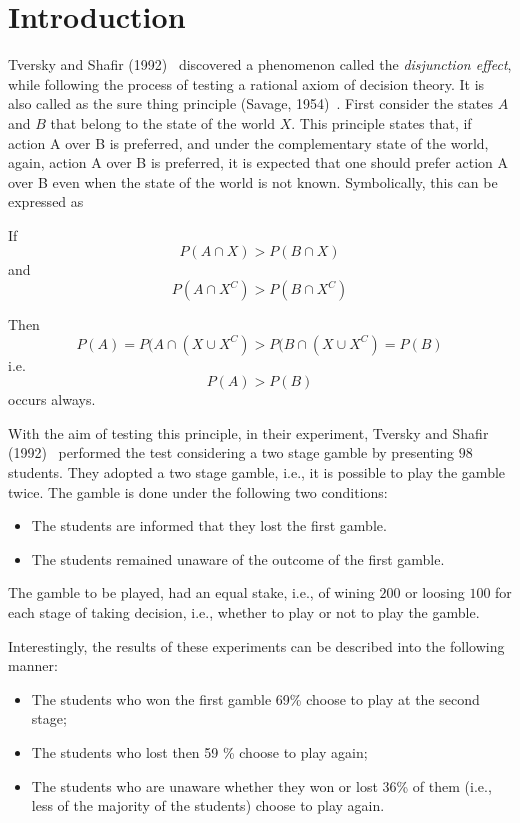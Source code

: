 \documentclass[review]{elsarticle}
\begin{document}


\section{Introduction}
Tversky and Shafir (1992)~\cite{tversky1992choice} discovered a phenomenon called the {\it disjunction effect}, while following the process of testing a rational axiom of decision theory. It is also called as the sure thing principle (Savage, 1954)~\cite{savage1954foundations}. First consider the states $A$ and $B$ that belong to the state of the world $X$.  This principle states that, if action A over B is preferred, and under the complementary state of the world, again, action A over B is preferred, it is expected that one should prefer action A over B even when the state of the world is not known. Symbolically, this can be expressed as

 If $${P(A\cap X) > P(B \cap X)} $$ and $${P(A\cap X^C) > P(B \cap X^C)}$$

Then $$ P(A) = P(A \cap (X\cup X^C) > P(B \cap (X \cup X^C) = P(B)$$   
i.e. $$ P (A) > P (B) $$ occurs always. 

With the aim of testing this principle, in their experiment, Tversky and Shafir (1992)~\cite{tversky1992choice} performed the test considering a two stage gamble by presenting $98$ students. 
They adopted a two stage gamble, i.e., it is possible to play the gamble twice. The gamble is done under the following two conditions: 
\begin{itemize}
\item The students are informed that they lost the first gamble.
\item The students remained unaware of the outcome of the first gamble.
\end{itemize}

The gamble to be played, had an equal stake, i.e., of wining ${200}$ or loosing ${100}$ for each stage of taking decision, i.e., whether to play or not to play the gamble. 

Interestingly, the results of these experiments can be described into the following manner: 
	\begin{itemize}
		\item The students who won the first gamble 69\% choose to play at the second stage;
		\item The students who lost then 59 \% choose to play again;	
		\item The students who are unaware whether they won or lost 36\% of them (i.e., less of the majority of the students) choose to play again.
			
	\end{itemize}
	
\end{document}
